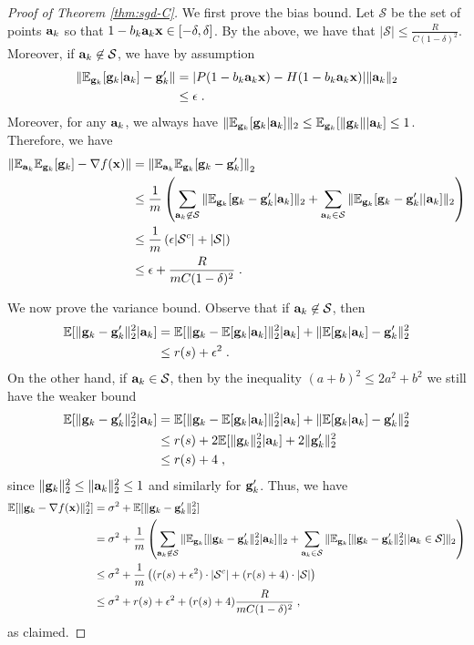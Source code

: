 \documentclass{article}
\def\a{{\bf a}}
\def\g{{\bf g}}
\def\x{{\bf x}}
\def\E{\mathbb{E}}
\begin{document}
\begin{proof}[Proof of Theorem \ref{thm:sgd-C}]
We first prove the bias bound.
Let $\mathcal{S}$ be the set of points $\a_k$ so that $1 - b_k \a_k \x \in [-\delta, \delta]$.
By the above, we have that $|\mathcal{S}| \leq \frac{R}{C(1 - \delta)^2}$.
Moreover, if $\a_k \not\in \mathcal{S}$, we have by assumption 
\begin{align*}
\| \E_{\g_k} [\g_k | \a_k] - \g'_k \| &= |P(1 - b_k \a_k \x) - H(1 - b_k \a_k \x) | \| \a_k \|_2 \\
 &\leq \epsilon \; .
\end{align*}
Moreover, for any $\a_k$, we always have $\| \E_{\g_k} [\g_k | \a_k] \|_2 \leq  \E_{\g_k} [ \| \g_k \| | \a_k] \leq 1$.
Therefore, we have
\begin{align*}
\left\| \E_{\a_k} \E_{\g_k} [  \g_k ] - \nabla f(\x) \right\| &=  \left\| \E_{\a_k} \E_{\g_k} [  \g_k - \g'_k] \right\|_2 \\
&\leq \frac{1}{m} \left( \sum_{\a_k \not\in \mathcal{S}} \| \E_{\g_k} [  \g_k - \g'_k| \a_k ] \|_2 + \sum_{\a_k \in \mathcal{S}} \| \E_{\g_k} [  \g_k - \g'_k | | \a_k] \|_2  \right) \\
&\leq \frac{1}{m} \left( \epsilon |\mathcal{S}^c|  + |\mathcal{S}| \right) \\
&\leq \epsilon + \frac{R}{m C (1 - \delta)^2} \; .
\end{align*}

We now prove the variance bound.
Observe that if $\a_k \not\in \mathcal{S}$, then 
\begin{align*}
\E [\| \g_k - \g'_k \|_2^2 | \a_k ] &=  \E [\| \g_k - \E[\g_k | \a_k] \|_2^2 | \a_k] + \|  \E[\g_k | \a_k] - \g'_k \|_2^2 \\
&\leq r(s) + \epsilon^2 \; .
\end{align*}
On the other hand, if $\a_k \in \mathcal{S}$, then by the inequality $(a + b)^2 \leq 2a^2 + b^2$ we still have the weaker bound
\begin{align*}
\E [\| \g_k - \g'_k \|_2^2 | \a_k ] &= \E [\| \g_k - \E[\g_k | \a_k] \|_2^2 | \a_k] + \|  \E[\g_k | \a_k] - \g'_k \|_2^2 \\
&\leq r(s) + 2 \E [\| \g_k \|_2^2 | \a_k] + 2 \| \g'_k \|_2^2 \\
&\leq r(s) + 4 \; ,
\end{align*}
since $\| \g_k \|_2^2 \leq \| \a_k \|_2^2 \leq 1$ and similarly for $\g'_k$.
Thus, we have 
\begin{align*}
\E [\| \g_k - \nabla f(\x) \|_2^2] &= \sigma^2 + \E [\| \g_k - \g'_k \|_2^2 ] \\
&= \sigma^2 + \frac{1}{m} \left( \sum_{\a_k \not\in \mathcal{S}} \| \E_{\g_k} [ \| \g_k - \g'_k \|_2^2 | \a_k] \|_2 + \sum_{\a_k \in \mathcal{S}} \| \E_{\g_k} [  \| \g_k - \g'_k \|_2^2 | | \a_k \in \mathcal{S}] \|_2  \right) \\
&\leq \sigma^2 + \frac{1}{m} \left( (r(s) + \epsilon^2) \cdot |\mathcal{S}^c| + (r(s) + 4) \cdot | \mathcal{S} | \right) \\
&\leq \sigma^2 + r(s) + \epsilon^2 +   (r(s) + 4)\frac{R}{m C (1 - \delta)^2} \; ,
\end{align*}
as claimed.
\end{proof}
\end{document}
